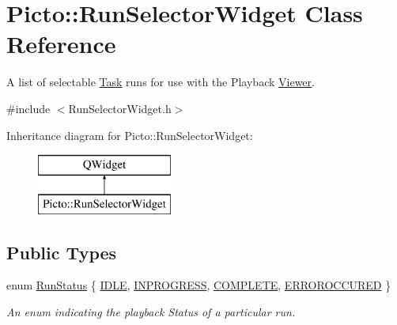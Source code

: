 \hypertarget{class_picto_1_1_run_selector_widget}{\section{Picto\-:\-:Run\-Selector\-Widget Class Reference}
\label{class_picto_1_1_run_selector_widget}
}


A list of selectable \hyperlink{class_picto_1_1_task}{Task} runs for use with the Playback \hyperlink{class_viewer}{Viewer}.  




{\ttfamily \#include $<$Run\-Selector\-Widget.\-h$>$}

Inheritance diagram for Picto\-:\-:Run\-Selector\-Widget\-:\begin{figure}[H]
\begin{center}
\leavevmode
\includegraphics[height=2.000000cm]{class_picto_1_1_run_selector_widget}
\end{center}
\end{figure}
\subsection*{Public Types}
\begin{DoxyCompactItemize}
\item 
enum \hyperlink{class_picto_1_1_run_selector_widget_ac540ab59a379b3bfb5534ecde54dc2aa}{Run\-Status} \{ \hyperlink{class_picto_1_1_run_selector_widget_ac540ab59a379b3bfb5534ecde54dc2aaac90c3e6a9887ce38cb4d5e388a6da6cb}{I\-D\-L\-E}, 
\hyperlink{class_picto_1_1_run_selector_widget_ac540ab59a379b3bfb5534ecde54dc2aaac59e96d5d1b99cca2cbc8a9d868a8750}{I\-N\-P\-R\-O\-G\-R\-E\-S\-S}, 
\hyperlink{class_picto_1_1_run_selector_widget_ac540ab59a379b3bfb5534ecde54dc2aaaa24e25489965138f8328057b5a8f473a}{C\-O\-M\-P\-L\-E\-T\-E}, 
\hyperlink{class_picto_1_1_run_selector_widget_ac540ab59a379b3bfb5534ecde54dc2aaa1c86993f07946b6bd08888785978b03a}{E\-R\-R\-O\-R\-O\-C\-C\-U\-R\-E\-D}
 \}
\begin{DoxyCompactList}\small\item\em An enum indicating the playback Status of a particular run. \end{DoxyCompactList}\end{DoxyCompactItemize}
